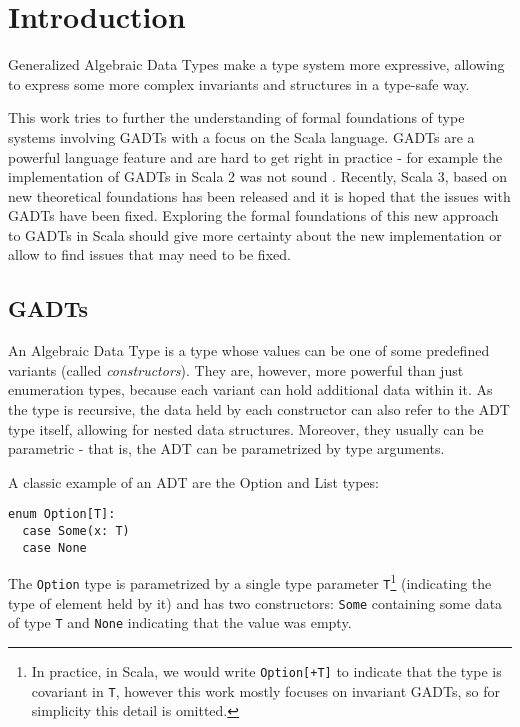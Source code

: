 \chapter{Introduction}
Generalized Algebraic Data Types make a type system more expressive, allowing to express some more complex invariants and structures in a type-safe way.

This work tries to further the understanding of formal foundations of type systems involving GADTs with a focus on the Scala language. GADTs are a powerful language feature and are hard to get right in practice - for example the implementation of GADTs in Scala 2 was not sound \cite{TODO}. Recently, Scala 3, based on new theoretical foundations has been released and it is hoped that the issues with GADTs have been fixed. Exploring the formal foundations of this new approach to GADTs in Scala should give more certainty about the new implementation or allow to find issues that may need to be fixed.


\section{GADTs}

An Algebraic Data Type is a type whose values can be one of some predefined variants (called \textit{constructors}). They are, however, more powerful than just enumeration types, because each variant can hold additional data within it. As the type is recursive, the data held by each constructor can also refer to the ADT type itself, allowing for nested data structures. Moreover, they usually can be parametric - that is, the ADT can be parametrized by type arguments.

A classic example of an ADT are the Option and List types:

\begin{verbatim}
enum Option[T]:
  case Some(x: T)
  case None
\end{verbatim}

The \texttt{Option} type is parametrized by a single type parameter \texttt{T}\footnote{In practice, in Scala, we would write \texttt{Option[+T]} to indicate that the type is covariant in \texttt{T}, however this work mostly focuses on invariant GADTs, so for simplicity this detail is omitted.} (indicating the type of element held by it) and has two constructors: \texttt{Some} containing some data of type \texttt{T} and \texttt{None} indicating that the value was empty.

